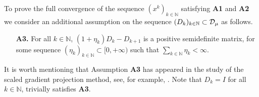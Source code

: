 To  prove  the full convergence of the  sequence  $(x^k)_{k\in\mathbb{N}}$ satisfying {\bf A1} and {\bf A2} we consider an additional assumption on the sequence $(D_k)_{k\in {\mathbb N}}\subset {\cal D}_{\mu}$ as follows.
\begin{itemize}
	\item[{\bf A3.}] For all $k \in \mathbb{N}$,   $(1+\eta_k)D_k-  D_{k+1}$ is  a positive semidefinite matrix, for some sequence $(\eta_k)_{k\in\mathbb{N}}\subset [0, +\infty)$ such that $\sum_{k\in \mathbb{N}}\eta_k<\infty$.
\end{itemize}
It is worth mentioning that Assumption  {\bf A3} has appeared in the study of the scaled gradient projection method, see, for example, \cite{bonettini2019recent}. Note that $D_k= I$ for all $k\in {\mathbb N}$, trivially satisfies {\bf A3}.

